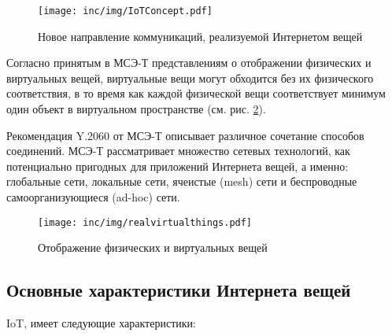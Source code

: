 \begin{figure}
  \centering
  \texttt{[image: inc/img/IoTConcept.pdf]}
	\caption{Новое направление коммуникаций, реализуемой Интернетом вещей\cite{itutiot2012}}
  \label{fig:iotconcept}
\end{figure}

Согласно принятым в МСЭ-Т представлениям о отображении физических и виртуальных вещей, виртуальные вещи могут обходится без их физического соответствия, в то время как каждой физической вещи соответствует минимум один объект в виртуальном пространстве (см. рис. \ref{fig:physvirtworld}).  

Рекомендация Y.2060 от МСЭ-Т описывает различное сочетание способов соединений.
МСЭ-Т рассматривает множество сетевых технологий, как потенциально пригодных для приложений Интернета вещей, а именно: глобальные сети, локальные сети, ячеистые (mesh) сети и беспроводные самоорганизующиеся (ad-hoc) сети.

\begin{figure}
  \centering
  \texttt{[image: inc/img/realvirtualthings.pdf]}
	\caption{Отображение физических и виртуальных вещей\cite{itutiot2012}}
  \label{fig:physvirtworld}
\end{figure}

\subsection{Основные характеристики Интернета вещей}

IoT, имеет следующие характеристики:

